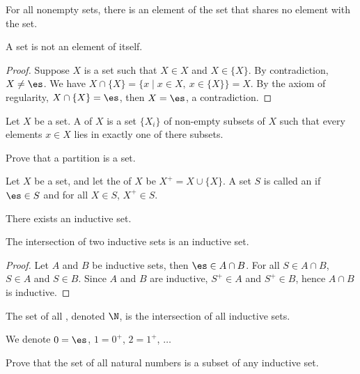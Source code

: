 \documentclass[10pt]{article}
\begin{document}
\begin{Axiom of regularity}
    For all nonempty sets, there is an element of the set that shares no element with the set.
\end{Axiom of regularity}
\begin{proposition}
    A set is not an element of itself.
\end{proposition}
\begin{proof}
    Suppose $X$ is a set such that $X\in X$ and $X\in\{X\}$. By contradiction, $X\ne\es$. We have $X\cap\{X\}=\{x\mid x\in X,\ x\in\{X\}\}=X$. By the axiom of regularity, $X\cap\{X\}=\es$, then $X=\es$, a contradiction.
\end{proof}
\begin{definition}
    Let $X$ be a set. A  of $X$ is a set $\{{X}_{i}\}$ of non-empty subsets of $X$ such that every elements $x\in X$ lies in exactly one of there subsets.
\end{definition}
\begin{problem}
    Prove that a partition is a set.
\end{problem}
\begin{definition}
    Let $X$ be a set, and let the  of $X$ be ${X}^{+}=X\cup\{X\}$. A set $S$ is called an  if $\es\in S$ and for all $X\in S$, ${X}^{+}\in S$.
\end{definition}
\begin{Axiom of infinity}
    There exists an inductive set.
\end{Axiom of infinity}
\begin{proposition}
    The intersection of two inductive sets is an inductive set.
\end{proposition}
\begin{proof}
    Let $A$ and $B$ be inductive sets, then $\es\in A\cap B$. For all $S\in A\cap B$, $S\in A$ and $S\in B$. Since $A$ and $B$ are inductive, ${S}^{+}\in A$ and ${S}^{+}\in B$, hence $A\cap B$ is inductive.
\end{proof}
\par
\begin{definition}
    The set of all , denoted $\N$, is the intersection of all inductive sets. 
\end{definition}
\par
We denote $0=\es$, $1={0}^{+}$, $2={1}^{+}$, $\dots$
\begin{problem}
    Prove that the set of all natural numbers is a subset of any inductive set.
\end{problem}
\end{document}
